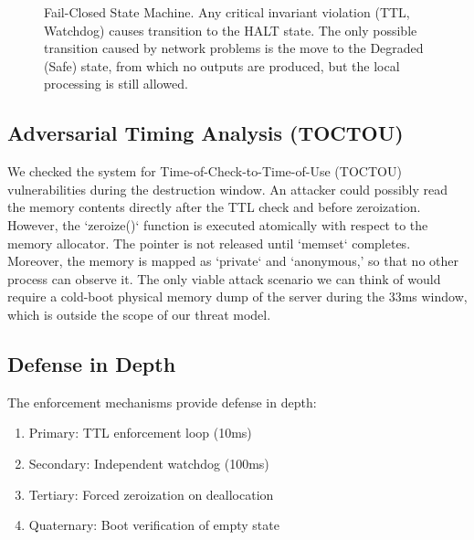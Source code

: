 \documentclass[conference]{IEEEtran}
\begin{document}
\begin{figure}[htbp]
\centering
{}
\caption{Fail-Closed State Machine. Any critical invariant violation (TTL, Watchdog) causes transition to the HALT state. The only possible transition caused by network problems is the move to the Degraded (Safe) state, from which no outputs are produced, but the local processing is still allowed.}
\label{fig:states}
\end{figure}

\subsection{Adversarial Timing Analysis (TOCTOU)}
We checked the system for Time-of-Check-to-Time-of-Use (TOCTOU) vulnerabilities during the destruction window. An attacker could possibly read the memory contents directly after the TTL check and before zeroization. However, the `zeroize()` function is executed atomically with respect to the memory allocator. The pointer is not released until `memset` completes. Moreover, the memory is mapped as `private` and `anonymous,' so that no other process can observe it. The only viable attack scenario we can think of would require a cold-boot physical memory dump of the server during the 33ms window, which is outside the scope of our threat model.

\subsection{Defense in Depth}
The enforcement mechanisms provide defense in depth:
\begin{enumerate}
    \item Primary: TTL enforcement loop (10ms)
    \item Secondary: Independent watchdog (100ms)
    \item Tertiary: Forced zeroization on deallocation
    \item Quaternary: Boot verification of empty state
\end{enumerate}
\end{document}
